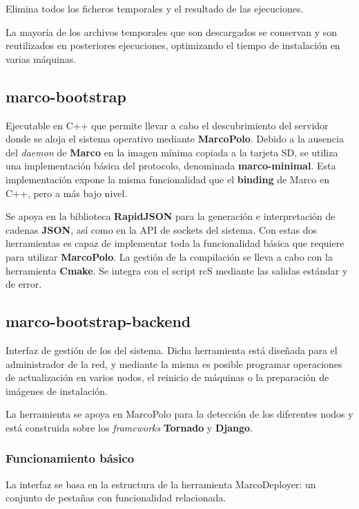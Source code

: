 \documentclass{article}
\begin{document}
Elimina todos los ficheros temporales y el resultado de las ejecuciones.

La mayoría de los archivos temporales que son descargados se conservan y son reutilizados en posteriores ejecuciones, optimizando el tiempo de instalación en varias máquinas.

\subsection{marco-bootstrap}

Ejecutable en C++ que permite llevar a cabo el descubrimiento del servidor donde se aloja el sistema operativo mediante \textbf{MarcoPolo}. Debido a la ausencia del \textit{daemon} de \textbf{Marco} en la imagen mínima copiada a la tarjeta SD, se utiliza una implementación básica del protocolo, denominada \textbf{marco-minimal}. Esta implementación expone la misma funcionalidad que el \textbf{binding} de Marco en C++, pero a más bajo nivel.

Se apoya en la biblioteca \textbf{RapidJSON} para la generación e interpretación de cadenas \textbf{JSON}, así como en la API de sockets del sistema. Con estas dos herramientas es capaz de implementar toda la funcionalidad básica que requiere para utilizar \textbf{MarcoPolo}. La gestión de la compilación se lleva a cabo con la herramienta \textbf{Cmake}. Se integra con el script rcS mediante las salidas estándar y de error.

\subsection{marco-bootstrap-backend}

Interfaz de gestión de los del sistema. Dicha herramienta está diseñada para el administrador de la red, y mediante la misma es posible programar operaciones de actualización en varios nodos, el reinicio de máquinas o la preparación de imágenes de instalación.

La herramienta se apoya en MarcoPolo para la detección de los diferentes nodos y está construida sobre los \textit{frameworks} \textbf{Tornado} y \textbf{Django}.

\subsubsection{Funcionamiento básico}

La interfaz se basa en la estructura de la herramienta MarcoDeployer: un conjunto de pestañas con funcionalidad relacionada.
\end{document}
